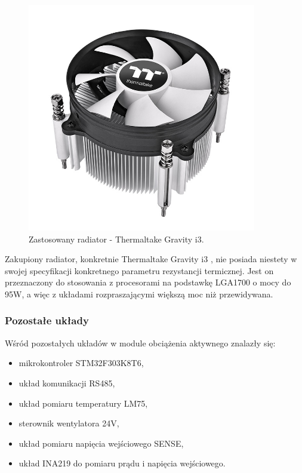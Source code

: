 \begin{figure}[h!]
    \begin{center}
        \includegraphics[width = 10cm]{images/gravityi3.jpg}
        \caption{Zastosowany radiator - Thermaltake Gravity i3.}
        \label{fig:thermaltake}
    \end{center}
\end{figure}

Zakupiony radiator, konkretnie Thermaltake Gravity i3 \cite{thermaltake}, nie posiada niestety w swojej specyfikacji konkretnego 
parametru rezystancji termicznej. Jest on przeznaczony do stosowania z procesorami na podstawkę LGA1700 o mocy do 95W, 
a więc z układami rozpraszającymi większą moc niż przewidywana. 






\subsubsection{Pozostałe układy}

Wśród pozostałych układów w module obciążenia aktywnego znalazły się:

\begin{itemize}
    \item mikrokontroler STM32F303K8T6,
    \item układ komunikacji RS485,
    \item układ pomiaru temperatury LM75,
    \item sterownik wentylatora 24V,
    \item układ pomiaru napięcia wejściowego SENSE,
    \item układ INA219 do pomiaru prądu i napięcia wejściowego.
\end{itemize}

